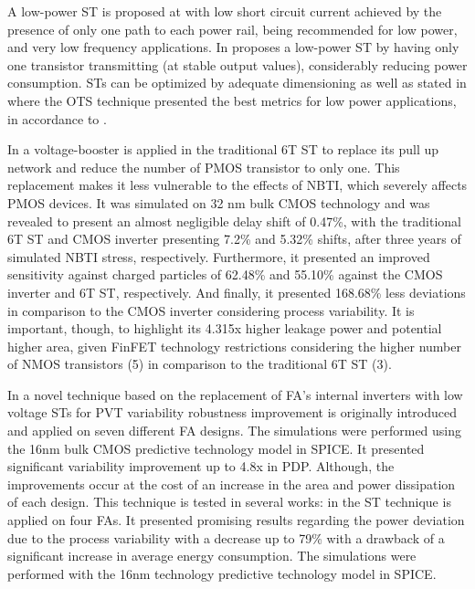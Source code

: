 \documentclass[diss,pgmicro,english]{iiufrgs}
\begin{document}
 A low-power ST is proposed at \cite{al2002low} with low short circuit current achieved by the presence of only one path to each power rail, being recommended for low power, and very low frequency applications. In \cite{pedroni2005low} proposes a low-power ST by having only one transistor transmitting (at stable output values), considerably reducing power consumption. STs can be optimized by adequate dimensioning as well as stated in \cite{tache2018reliability} where the OTS technique presented the best metrics for low power applications, in accordance to \cite{zimpeck2016}.

In \cite{shah2020soft} a voltage-booster is applied in the traditional 6T ST to replace its pull up network and reduce the number of PMOS transistor to only one. This replacement makes it less vulnerable to the effects of NBTI, which severely affects PMOS devices. It was simulated on 32 nm bulk CMOS technology and was revealed to present an almost negligible delay shift of 0.47\%, with the traditional 6T ST and CMOS inverter presenting 7.2\% and 5.32\% shifts, after three years of simulated NBTI stress, respectively. Furthermore, it presented an improved sensitivity against charged particles of 62.48\% and 55.10\% against the CMOS inverter and 6T ST, respectively. And finally, it presented 168.68\% less deviations in comparison to the CMOS inverter considering process variability. It is important, though, to highlight its 4.315x higher leakage power and potential higher area, given FinFET technology restrictions considering the higher number of NMOS transistors (5) in comparison to the traditional 6T ST (3).

In \cite{dokania2015circuit} a novel technique based on the replacement of FA’s internal inverters with low voltage STs for PVT variability robustness improvement is originally introduced and applied on seven different FA designs. The simulations were performed using the 16nm bulk CMOS predictive technology model in SPICE. It presented significant variability improvement up to 4.8x in PDP. Although, the improvements occur at the cost of an increase in the area and power dissipation of each design. This technique is tested in several works: in \cite{toledo2018pros} the ST technique is applied on four FAs. It presented promising results regarding the power deviation due to the process variability with a decrease up to 79\% with a drawback of a significant increase in average energy consumption. The simulations were performed with the 16nm technology predictive technology model in SPICE.
\end{document}
